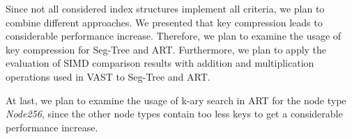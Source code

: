 \documentclass[runningheads,a4paper]{llncs}
\begin{document}
Since not all considered index structures implement all criteria, we plan to combine different approaches. We presented that key compression leads to considerable performance increase. Therefore, we plan to examine the usage of key compression for Seg-Tree and ART. Furthermore, we plan to apply the evaluation of SIMD comparison results with addition and multiplication operations used in VAST to Seg-Tree and ART. 

At last, we plan to examine the usage of k-ary search in ART for the node type \emph{Node256}, since the other node types contain too less keys to get a considerable performance increase. 




 
\end{document}
